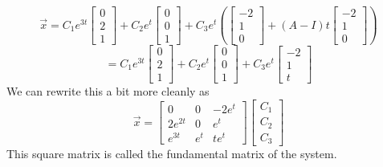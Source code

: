 \begin{equation*}
	\vec{x} = C_1e^{3t}\begin{bmatrix}
		0 \\
		2 \\
		1
	\end{bmatrix} + C_2e^{t}\begin{bmatrix}
		0 \\
		0 \\
		1
	\end{bmatrix} + C_3e^{t}\left(\begin{bmatrix}
		-2 \\
		1 \\
		0
	\end{bmatrix} + (A - I)t\begin{bmatrix}
		-2 \\
		1 \\
		0
	\end{bmatrix}\right)
\end{equation*}
\begin{equation*}
	= C_1e^{3t}\begin{bmatrix}
		0 \\
		2 \\
		1
	\end{bmatrix} + C_2e^{t}\begin{bmatrix}
		0 \\
		0 \\
		1
	\end{bmatrix} + C_3e^{t}\begin{bmatrix}
		-2 \\
		1 \\
		t
	\end{bmatrix}
\end{equation*}
We can rewrite this a bit more cleanly as
\begin{equation*}
	\vec{x} = \begin{bmatrix}
		0 & 0 & -2e^t \\
		2e^{2t} & 0 & e^t \\
		e^{3t} & e^t & te^t
	\end{bmatrix} \begin{bmatrix}
		C_1 \\
		C_2 \\
		C_3
	\end{bmatrix}
\end{equation*}
This square matrix is called the fundamental matrix of the system.